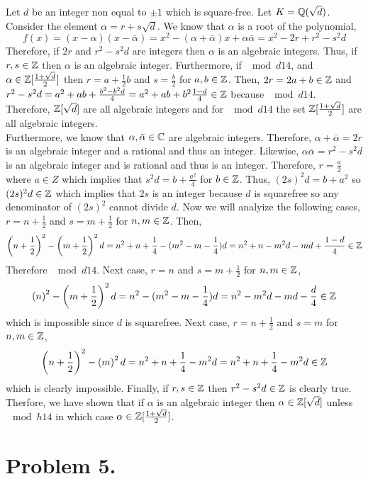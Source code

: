 \documentclass[12pt]{extarticle}
\begin{document}
Let $d$ be an integer non equal to $\pm 1$ which is square-free. Let $K = \mathbb{Q}(\sqrt{d})$. Consider the element $\alpha = r + s \sqrt{d}$. We know that $\alpha$ is a root of the polynomial,
\[ f(x) = (x - \alpha)(x - \bar{\alpha}) = x^2 - (\alpha + \bar{\alpha}) x + \alpha \bar{\alpha} = x^2 - 2 r + r^2 - s^2 d \]
Therefore, if $2r$ and $r^2 - s^2 d$ are integers then $\alpha$ is an algebraic integers. Thus, if $r, s \in \mathbb{Z}$ then $\alpha$ is an algebraic integer. Furthermore, if $\mod{d}{1}{4}$, and $\alpha \in \mathbb{Z}[\frac{1 + \sqrt{d}}{2}]$ then $r = a + \frac{1}{2} b$ and $s = \frac{b}{2}$ for $a, b \in \mathbb{Z}$. Then, $2 r = 2a + b \in \mathbb{Z}$ and $r^2 - s^2 d = a^2 + ab + \frac{b^2 - b^2 d}{4} = a^2 + ab + b^2 \frac{1 - d}{4} \in \mathbb{Z}$ because $\mod{d}{1}{4}$. Therefore, $\mathbb{Z}[\sqrt{d}]$ are all algebraic integers and for $\mod{d}{1}{4}$ the set $\mathbb{Z}[\frac{1 + \sqrt{d}}{2}]$ are all algebraic integers. 
\bigskip\\
Furthermore, we know that $\alpha, \bar{\alpha} \in \mathbb{C}$ are algebraic integers. Therefore, $\alpha + \bar{\alpha} = 2 r$ is an algebraic integer and a rational and thus an integer. Likewise, $\alpha \bar{\alpha} = r^2 - s^2 d$ is an algebraic integer and is rational and thus is an integer. Therefore, $r = \frac{a}{2}$ where $a\in Z$ which implies that $s^2 d = b + \frac{a^2}{4}$ for $b \in \mathbb{Z}$. Thus, $(2s)^2 d = b + a^2$ so $(2s)^2 d \in \mathbb{Z}$ which implies that $2s$ is an integer because $d$ is squarefree so any denominator of $(2s)^2$ cannot divide $d$. Now we will analyize the following cases, $r = n + \frac{1}{2}$ and $s = m + \frac{1}{2}$ for $n,m \in \mathbb{Z}$. Then,
\[ \left( n + \frac{1}{2} \right)^2 - \left(m + \frac{1}{2} \right)^2 d = n^2 + n + \frac{1}{4} - (m^2 - m - \frac{1}{4})d = n^2 + n - m^2 d - m d + \frac{1 - d}{4} \in \mathbb{Z}\]
Therefore $\mod{d}{1}{4}$.
Next case,  $r = n$ and $s = m + \frac{1}{2}$ for $n,m \in \mathbb{Z}$,
\[ \left( n \right)^2 - \left(m + \frac{1}{2} \right)^2 d = n^2 - (m^2 - m - \frac{1}{4})d = n^2 - m^2 d - m d - \frac{d}{4} \in \mathbb{Z} \]
which is impossible since $d$ is squarefree.
Next case,  $r = n + \frac{1}{2}$ and $s = m$ for $n,m \in \mathbb{Z}$,
\[ \left( n + \frac{1}{2} \right)^2 - \left(m \right)^2 d = n^2 + n + \frac{1}{4} - m ^2d = n^2 + n + \frac{1}{4} - m^2 d \in \mathbb{Z}\]
which is clearly impossible. Finally, if $r, s \in \mathbb{Z}$ then $r^2 - s^2 d \in \mathbb{Z}$ is clearly true. Therfore, we have shown that if $\alpha$ is an algebraic integer then $\alpha \in \mathbb{Z}[\sqrt{d}]$ unless $\mod{h}{1}{4}$ in which case $\alpha \in \mathbb{Z}[\frac{1 + \sqrt{d}}{2}]$. 

\section*{Problem 5.}
\end{document}
